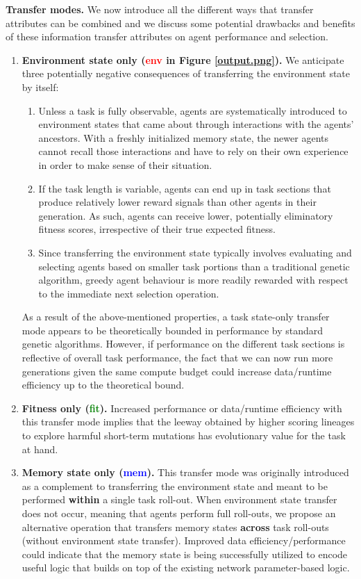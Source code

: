 \documentclass[dvipsnames,format=sigconf,anonymous=false,review=false]{acmart}
\begin{document}
\textbf{Transfer modes.} We now introduce all the different ways that transfer attributes can be combined and we discuss some potential drawbacks and benefits of these information transfer attributes on agent performance and selection.

\begin{enumerate}

\item \textbf{Environment state only (\textcolor{red}{env} \normalfont in Figure \ref{output.png}\textbf{).}} We anticipate three potentially negative consequences of transferring the environment state by itself:
\begin{enumerate}
\item Unless a task is fully observable, agents are systematically introduced to environment states that came about through interactions with the agents’ ancestors. With a freshly initialized memory state, the newer agents cannot recall those interactions and have to rely on their own experience in order to make sense of their situation.
\item If the task length is variable, agents can end up in task sections that produce relatively lower reward signals than other agents in their generation. As such, agents can receive lower, potentially eliminatory fitness scores, irrespective of their true expected fitness.
\item Since transferring the environment state typically involves evaluating and selecting agents based on smaller task portions than a traditional genetic algorithm, greedy agent behaviour is more readily rewarded with respect to the immediate next selection operation. 
\end{enumerate}

As a result of the above-mentioned properties, a task state-only transfer mode appears to be theoretically bounded in performance by standard genetic algorithms. However, if performance on the different task sections is reflective of overall task performance, the fact that we can now run more generations given the same compute budget could increase data/runtime efficiency up to the theoretical bound.

\item \textbf{Fitness only (\textcolor{Green}{fit}).} Increased performance or data/runtime efficiency with this transfer mode implies that the leeway obtained by higher scoring lineages to explore harmful short-term mutations has evolutionary value for the task at hand.

\item \textbf{Memory state only (\textcolor{Blue}{mem}).} This transfer mode was originally introduced as a complement to transferring the environment state and meant to be performed \textbf{within} a single task roll-out. When environment state transfer does not occur, meaning that agents perform full roll-outs, we propose an alternative operation that transfers memory states \textbf{across} task roll-outs (without environment state transfer). Improved data efficiency/performance could indicate that the memory state is being successfully utilized to encode useful logic that builds on top of the existing network parameter-based logic.


\end{enumerate}
\end{document}

